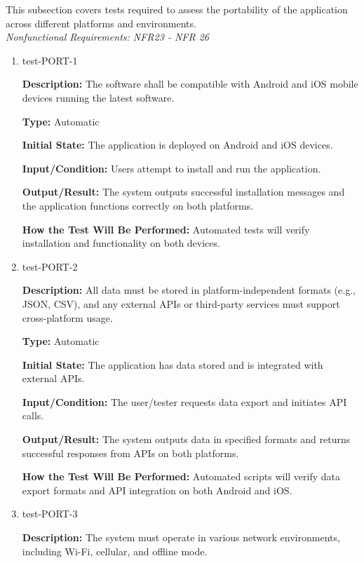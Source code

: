 \documentclass[12pt, titlepage]{article}
\begin{document}
This subsection covers tests required to assess the portability of the application across different platforms and environments. \\
\textit{Nonfunctional Requirements: NFR23 - NFR 26}

\begin{enumerate}

\item{test-PORT-1\\}

\textbf{Description:} The software shall be compatible with Android and iOS
mobile devices running the latest software.

\textbf{Type:} Automatic
					
\textbf{Initial State:} The application is deployed on Android and iOS devices.
					
\textbf{Input/Condition:} Users attempt to install and run the application.
					
\textbf{Output/Result:} The system outputs successful installation messages and
the application functions correctly on both platforms.
					
\textbf{How the Test Will Be Performed:} Automated tests will verify
installation and functionality on both devices.

\item{test-PORT-2\\}

\textbf{Description:} All data must be stored in platform-independent formats
(e.g., JSON, CSV), and any external APIs or third-party services must support
cross-platform usage.

\textbf{Type:} Automatic
					
\textbf{Initial State:} The application has data stored and is integrated with
external APIs.
					
\textbf{Input/Condition:} The user/tester requests data export and initiates API
calls.
					
\textbf{Output/Result:} The system outputs data in specified formats and returns
successful responses from APIs on both platforms.
					
\textbf{How the Test Will Be Performed:} Automated scripts will verify data
export formats and API integration on both Android and iOS.

\item{test-PORT-3\\}

\textbf{Description:} The system must operate in various network environments,
including Wi-Fi, cellular, and offline mode.


\end{enumerate}
\end{document}
